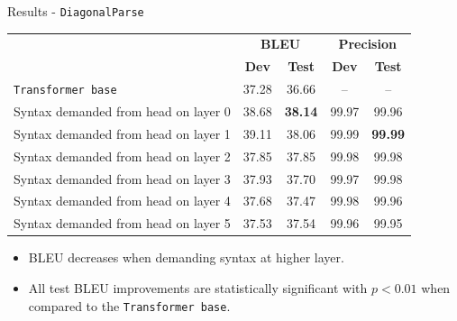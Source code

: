 \documentclass{beamer}
\def\transformerbase{\texttt{Transformer base}\xspace}
\def\DiagonalParse{\texttt{DiagonalParse}\xspace}
\begin{document}
\begin{frame}{Results - \DiagonalParse}
\begin{table}[t]
\small
\centering
\vspace{2ex}
  \begin{tabular}{lcc|cc}
    &  \multicolumn{2}{c}{\textbf{BLEU}} & \multicolumn{2}{|c}{\textbf{Precision}} \\
    & \textbf{Dev} & \textbf{Test} & \textbf{Dev} & \textbf{Test} \\
    \hline
    \transformerbase & 37.28 & 36.66 & -- & -- \\
    \hline
    Syntax demanded from head on layer 0 & 38.68 & \textbf{38.14} & 99.97 & 99.96 \\
    Syntax demanded from head on layer 1 & 39.11 & 38.06 & 99.99 & \textbf{99.99} \\
    Syntax demanded from head on layer 2 & 37.85 & 37.85 & 99.98 & 99.98 \\
    Syntax demanded from head on layer 3 & 37.93 & 37.70 & 99.97 & 99.98 \\
    Syntax demanded from head on layer 4 & 37.68 & 37.47 & 99.98 & 99.96 \\
    Syntax demanded from head on layer 5 & 37.53 & 37.54 & 99.96 & 99.95 \\
  \end{tabular}
\end{table}
\begin{itemize}
    \item BLEU decreases when demanding syntax at higher layer.
    \item All test BLEU improvements are statistically significant with $p<0.01$ when compared to the \transformerbase.
\end{itemize}
\end{frame}



\end{document}
